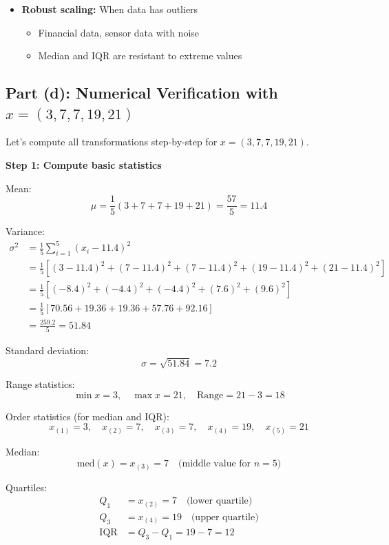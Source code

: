 \documentclass[12pt]{article}
\begin{document}
\begin{explanation}
\begin{itemize}
    \item \textbf{Robust scaling:} When data has outliers
    \begin{itemize}
        \item Financial data, sensor data with noise
        \item Median and IQR are resistant to extreme values
    \end{itemize}
\end{itemize}
\end{explanation}

\subsection{Part (d): Numerical Verification with \(x = (3, 7, 7, 19, 21)\)}

\begin{solution}
Let's compute all transformations step-by-step for \(x = (3, 7, 7, 19, 21)\).

\textbf{Step 1: Compute basic statistics}

Mean:
\[
\mu = \frac{1}{5}(3 + 7 + 7 + 19 + 21) = \frac{57}{5} = 11.4
\]

Variance:
\begin{align*}
\sigma^2 &= \frac{1}{5}\sum_{i=1}^{5}(x_i - 11.4)^2 \\
&= \frac{1}{5}\left[(3-11.4)^2 + (7-11.4)^2 + (7-11.4)^2 + (19-11.4)^2 + (21-11.4)^2\right] \\
&= \frac{1}{5}\left[(-8.4)^2 + (-4.4)^2 + (-4.4)^2 + (7.6)^2 + (9.6)^2\right] \\
&= \frac{1}{5}\left[70.56 + 19.36 + 19.36 + 57.76 + 92.16\right] \\
&= \frac{259.2}{5} = 51.84
\end{align*}

Standard deviation:
\[
\sigma = \sqrt{51.84} = 7.2
\]

Range statistics:
\[
\min x = 3, \quad \max x = 21, \quad \text{Range} = 21 - 3 = 18
\]

Order statistics (for median and IQR):
\[
x_{(1)} = 3, \quad x_{(2)} = 7, \quad x_{(3)} = 7, \quad x_{(4)} = 19, \quad x_{(5)} = 21
\]

Median:
\[
\text{med}(x) = x_{(3)} = 7 \quad \text{(middle value for } n=5\text{)}
\]

Quartiles:
\begin{align*}
Q_1 &= x_{(2)} = 7 \quad \text{(lower quartile)} \\
Q_3 &= x_{(4)} = 19 \quad \text{(upper quartile)} \\
\text{IQR} &= Q_3 - Q_1 = 19 - 7 = 12
\end{align*}


\end{solution}
\end{document}
